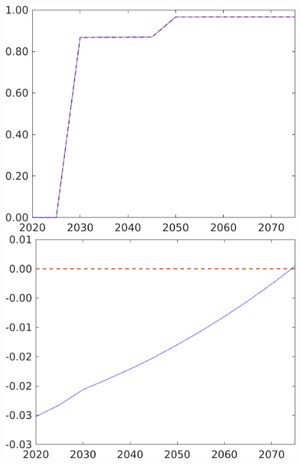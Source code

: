 \begin{figure}[h!!]
\begin{minipage}[]{0.32\textwidth}
	\end{minipage}
	\begin{minipage}[]{0.32\textwidth}
		\includegraphics[width=1\textwidth]{../../codding_model/own_basedOnFried/optimalPol_190722_tidiedUp/figures/all_July22/tauf_DDCompEffOPT_T_NoTaus_pol4_spillover0_noskill1_sep1_xgrowth0_etaa0.79_lgd0_lff0.png}
	\end{minipage}
\begin{minipage}[]{0.32\textwidth}
	\includegraphics[width=1\textwidth]{../../codding_model/own_basedOnFried/optimalPol_190722_tidiedUp/figures/all_July22/taul_DDCompEffOPT_T_NoTaus_pol4_spillover0_noskill1_sep1_xgrowth0_etaa0.79_lgd0_lff0.png}
\end{minipage}
\end{figure}
